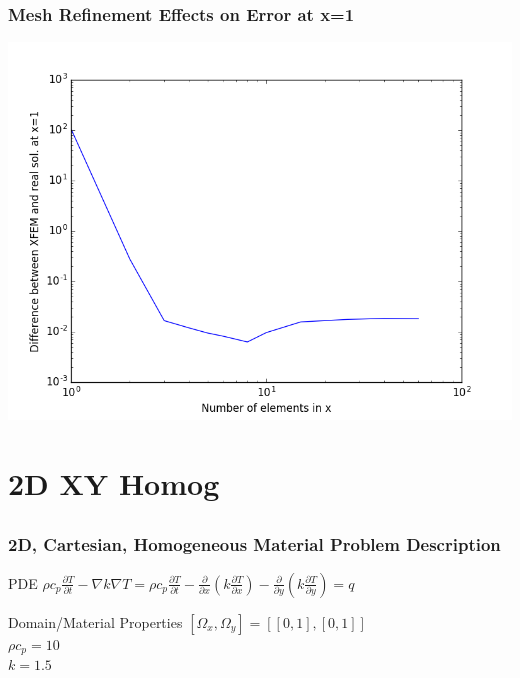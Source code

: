 \documentclass[]{beamer}
\begin{document}
\begin{frame}[t]\frametitle{Mesh Refinement Effects on Error at x=1}
	\begin{center}
		\includegraphics[scale=0.4]{figures/1D_rz_ls1m/1D_rz_ls1mat_neumann_comp}
	\end{center}
\end{frame}

\section{2D XY Homog}
\subsection{}
\begin{frame}[t]\frametitle{2D, Cartesian, Homogeneous Material Problem Description}
  \begin{block}{PDE}
    $\rho c_p\frac{\partial T}{\partial t} - \nabla k \nabla T = 
    \rho c_p\frac{\partial T}{\partial t} - \frac{\partial}{\partial x}
    \left(k\frac{\partial T}{\partial x}\right) - \frac{\partial}{\partial y}
    \left(k\frac{\partial T}{\partial y}\right)= q$
  \end{block}
  
  \begin{block}{Domain/Material Properties}
  	$[\Omega_x,\Omega_y] = [[0,1],[0,1]]$ \\
  	$\rho c_p = 10$ \\
  	$k=1.5$
  \end{block}
\end{frame}
  
\end{document}
